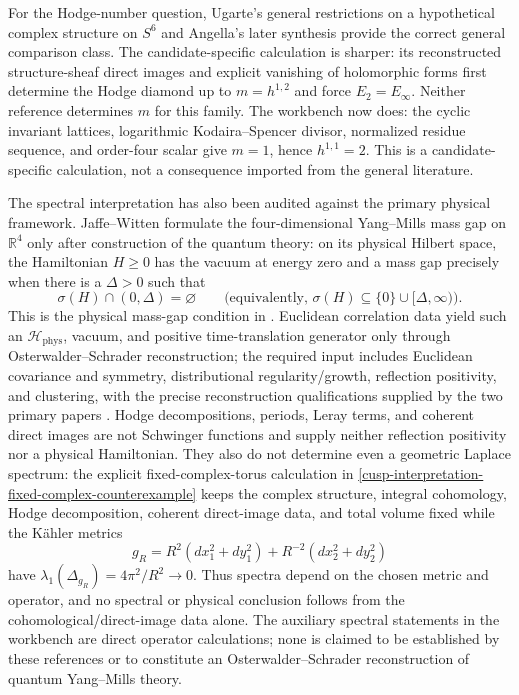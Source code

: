 For the Hodge-number question, Ugarte's general restrictions on a
hypothetical complex structure on $S^6$ \cite{Ugarte2000} and Angella's
later synthesis \cite{Angella2018} provide the correct general comparison
class.  The candidate-specific calculation is sharper: its reconstructed
structure-sheaf direct images and explicit vanishing of holomorphic forms
first determine the Hodge diamond up to $m=h^{1,2}$ and force
$E_2=E_\infty$.  Neither reference determines $m$ for this family.  The
workbench now does: the cyclic invariant lattices, logarithmic
Kodaira--Spencer divisor, normalized residue sequence, and order-four scalar
give $m=1$, hence $h^{1,1}=2$.  This is a candidate-specific calculation,
not a consequence imported from the general literature.

The spectral interpretation has also been audited against the primary
physical framework.  Jaffe--Witten formulate the four-dimensional
Yang--Mills mass gap on \(\mathbb R^4\) only after construction of the quantum
theory: on its physical Hilbert space, the Hamiltonian \(H\geq0\) has the
vacuum at energy zero and a mass gap precisely when there is a \(\Delta>0\)
such that
\[
  \sigma(H)\cap(0,\Delta)=\varnothing
  \qquad\text{(equivalently, }\sigma(H)\subseteq\{0\}\cup[\Delta,\infty)\text{)}.
\]
This is the physical mass-gap condition in \cite{JaffeWitten2000}.
Euclidean correlation data yield such an
\(\mathcal H_{\mathrm{phys}}\), vacuum, and positive time-translation
generator only through Osterwalder--Schrader reconstruction; the required
input includes Euclidean covariance and symmetry, distributional
regularity/growth, reflection positivity, and clustering, with the precise
reconstruction qualifications supplied by the two primary papers
\cite{OsterwalderSchrader1973,OsterwalderSchrader1975}.  Hodge decompositions,
periods, Leray terms, and coherent direct images are not Schwinger functions
and supply neither reflection positivity nor a physical Hamiltonian.  They
also do not determine even a geometric Laplace spectrum: the explicit
fixed-complex-torus calculation in
\cref{cusp-interpretation-fixed-complex-counterexample} keeps the complex
structure, integral cohomology, Hodge decomposition, coherent direct-image
data, and total volume fixed while the K\"ahler metrics
\[
 g_R=R^2(dx_1^2+dy_1^2)+R^{-2}(dx_2^2+dy_2^2)
\]
have \(\lambda_1(\Delta_{g_R})=4\pi^2/R^2\to0\).  Thus spectra depend on the
chosen metric and operator, and no spectral or physical conclusion follows
from the cohomological/direct-image data alone.  The auxiliary spectral
statements in the workbench are direct operator calculations; none is claimed
to be established by these references or to constitute an
Osterwalder--Schrader reconstruction of quantum Yang--Mills theory.

